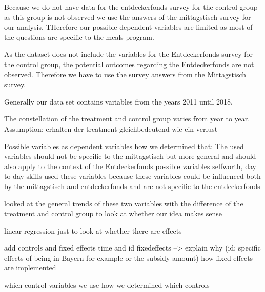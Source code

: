 \documentclass[12pt, a4paper, titlepage]{article}\usepackage[]{graphicx}\usepackage[]{color}
\begin{document}
Because we do not have data for the entdeckerfonds survey for the control group as this group is not observed we use the answers of the mittagstisch survey for our analysis. THerefore our possible dependent variables are limited as most of the questions are specific to the meals program. 

As the dataset does not include the variables for the Entdeckerfonds survey for the control group, the potential outcomes regarding the Entdeckerfonds are not observed. Therefore we have to use the survey answers from the Mittagstisch survey.

Generally our data set contains variables from the years 2011 until 2018. 

The constellation of the treatment and control group varies from year to year. 
Assumption: erhalten der treatment gleichbedeutend wie ein verlust

Possible variables as dependent variables
how we determined that:
The used variables should not be specific to the mittagstisch but more general and should also apply to the context of the Entdeckerfonds
possible variables selfworth, day to day skills
used these variables because these variables could be influenced both by the mittagstisch and entdeckerfonds and are not specific to the entdeckerfonds

looked at the general trends of these two variables with the difference of the treatment and control group to look at whether our idea makes sense

linear regression just to look at whether there are effects

add controls and fixed effects time and id fixedeffects --> explain why (id: specific effects of being in Bayern for example or the subsidy amount)
how fixed effects are implemented

which control variables we use
how we determined which controls


\begin{table}
\begin{center}
\caption{linear regression}
\label{table:coefficients}
\end{center}
\end{table}
\end{document}
